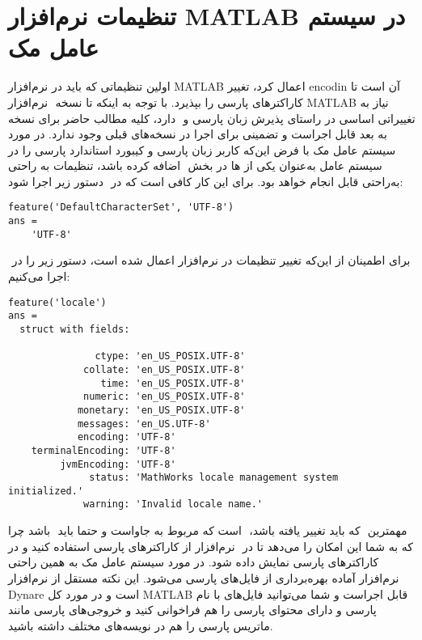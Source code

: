 \documentclass[12pt]{article}
\begin{document}
\section{تنظیمات نرم‌افزار MATLAB در سیستم عامل مک}
اولین تنظیماتی که باید در نرم‌افزار MATLAB اعمال کرد، تغییر ‪encodin‬‬ آن است تا کاراکترهای پارسی را بپذیرد. با توجه به اینکه تا نسخه ‪‬‬‬‬‬ نرم‌افزار MATLAB نیاز به تغییراتی اساسی در راستای پذیرش زبان پارسی و ‪‬‬‬ دارد، کلیه مطالب حاضر برای نسخه ‪‬‬‬ به بعد قابل اجراست و تضمینی برای اجرا در نسخه‌های قبلی وجود ندارد. در مورد سیستم عامل مک با فرض این‌که کاربر زبان پارسی  و کیبورد استاندارد پارسی را در سیستم عامل به‌عنوان یکی از ‪‬‬‬ها در بخش ‪‬‬‬ اضافه کرده باشد، تنظیمات به راحتی به‌راحتی قابل انجام خواهد بود. برای این کار کافی است که در ‪‬‬‬ دستور زیر اجرا شود:
\begin{latin}
\begin{lstlisting}[basicstyle=\scriptsize]
feature('DefaultCharacterSet', 'UTF-8')
ans =
    'UTF-8'
\end{lstlisting}
\end{latin}
برای اطمینان از این‌که تغییر تنظیمات در نرم‌افزار اعمال شده است، دستور زیر را در ‪‬‬‬  اجرا می‌کنیم:
 \begin{latin}
\begin{lstlisting}[basicstyle=\scriptsize]
feature('locale')
ans = 
  struct with fields:

               ctype: 'en_US_POSIX.UTF-8'
             collate: 'en_US_POSIX.UTF-8'
                time: 'en_US_POSIX.UTF-8'
             numeric: 'en_US_POSIX.UTF-8'
            monetary: 'en_US_POSIX.UTF-8'
            messages: 'en_US.UTF-8'
            encoding: 'UTF-8'
    terminalEncoding: 'UTF-8'
         jvmEncoding: 'UTF-8'
              status: 'MathWorks locale management system initialized.'
             warning: 'Invalid locale name.'
\end{lstlisting}
\end{latin}
مهمترین ‪‬‬‬ که باید تغییر یافته باشد،  ‪‬‬‬ است که مربوط به جاواست و حتما باید ‪‬‬‬‬ باشد چرا که به شما این امکان را می‌دهد تا در ‪‬‬ نرم‌افزار از کاراکترهای پارسی استفاده کنید و در ‪‬‬‬   کاراکترهای پارسی نمایش داده شود.  در مورد سیستم عامل مک به همین راحتی نرم‌افزار آماده بهره‌برداری از فایل‌های پارسی می‌شود. این نکته مستقل از نرم‌افزار Dynare است و در مورد کل MATLAB قابل اجراست و شما می‌توانید فایل‌های با نام پارسی و دارای محتوای پارسی را هم فراخوانی کنید و خروجی‌های پارسی مانند ماتریس پارسی را هم در نویسه‌های مختلف داشته باشید.
\end{document}
